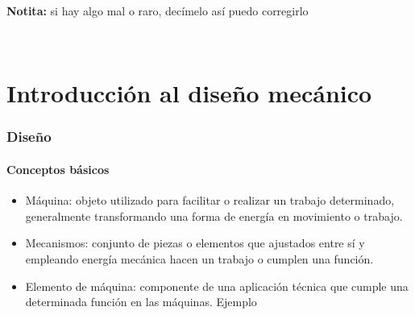 \documentclass[spanish,11pt,a4paper]{article}
\begin{document}
	\maketitle
	{\small \textbf{Notita:} si hay algo mal o raro, decímelo así puedo corregirlo }
	\begin{multicols}{2}
\textcolor{white}{.}
	\vspace{-3cm}   
	\tableofcontents
	\end{multicols}
	\newpage
	\part{Introducción al diseño mecánico}
	\section{Diseño}
	\subsection{Conceptos básicos}
	\begin{itemize}
		\item Máquina: objeto utilizado para facilitar o realizar un trabajo determinado,	generalmente transformando una forma de energía en	movimiento o trabajo.
		\item Mecanismos: conjunto de piezas o elementos que ajustados entre sí y empleando energía mecánica
		hacen un trabajo o cumplen una función.
		\item Elemento de máquina: componente de una
		aplicación técnica que cumple una determinada función en las máquinas. Ejemplo
	\end{itemize}
	
\end{document}
